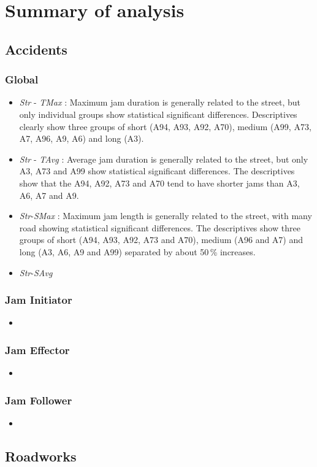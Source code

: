 \chapter{Summary of analysis}
\label{analysis_summary}


\section{Accidents}

\subsection{Global}

\begin{itemize}
    \item \textit{Str} - \textit{TMax} : Maximum jam duration is generally related to the street, but only individual groups show statistical significant differences. Descriptives clearly show three groups of short (A94, A93, A92, A70), medium (A99, A73, A7, A96, A9, A6) and long (A3).
    \item \textit{Str} - \textit{TAvg} : Average jam duration is generally related to the street, but only A3, A73 and A99 show statistical significant differences. The descriptives show that the A94, A92, A73 and A70 tend to have shorter jams than A3, A6, A7 and A9.
    \item \textit{Str}-\textit{SMax} : Maximum jam length is generally related to the street, with many road showing statistical significant differences. The descriptives show three groups of short (A94, A93, A92, A73 and A70), medium (A96 and A7) and long (A3, A6, A9 and A99) separated by about 50\,\% increases.
    \item \textit{Str}-\textit{SAvg}
\end{itemize}

\subsection{Jam Initiator}

\begin{itemize}
    \item 
\end{itemize}

\subsection{Jam Effector}

\begin{itemize}
    \item 
\end{itemize}

\subsection{Jam Follower}

\begin{itemize}
    \item 
\end{itemize}

\section{Roadworks}


